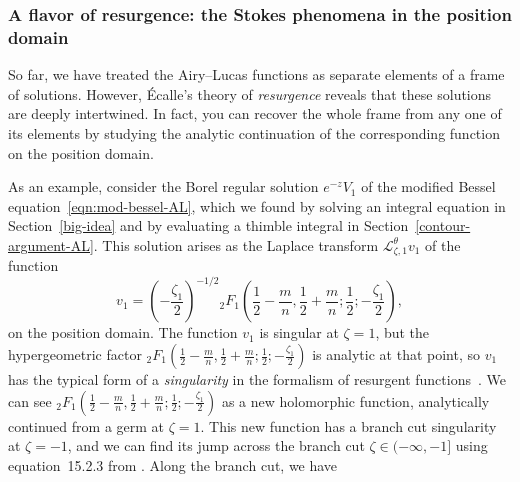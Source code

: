 \documentclass{article}
\newcommand{\laplace}{\mathcal{L}}
\theoremstyle{definition}
\theoremstyle{plain}
\begin{document}
\subsubsection{A flavor of resurgence: the Stokes phenomena in the position domain}\label{resurgence-AL}
%

So far, we have treated the Airy--Lucas functions as separate elements of a frame of solutions. However, \'{E}calle's theory of {\em resurgence} reveals that these solutions are deeply intertwined. In fact, you can recover the whole frame from any one of its elements by studying the analytic continuation of the corresponding function on the position domain.

As an example, consider the Borel regular solution $e^{-z} V_1$ of the modified Bessel equation~\eqref{eqn:mod-bessel-AL}, which we found by solving an integral equation in Section~\ref{big-idea} and by evaluating a thimble integral in Section~\ref{contour-argument-AL}. This solution arises as the Laplace transform $\laplace^\theta_{\zeta, 1} v_1$ of the function
\[ v_1 = \left(-\frac{\zeta_1}{2}\right)^{-1/2} {}_2F_1\left(\frac{1}{2}-\frac{m}{n},\frac{1}{2}+\frac{m}{n};\frac{1}{2};-\frac{\zeta_1}{2}\right), \]
on the position domain. The function $v_1$ is singular at $\zeta = 1$, but the hypergeometric factor ${}_2F_1\left(\frac{1}{2}-\frac{m}{n},\frac{1}{2}+\frac{m}{n};\frac{1}{2};-\frac{\zeta_1}{2}\right)$ is analytic at that point, so $v_1$ has the typical form of a {\em singularity} in the formalism of resurgent functions~\cite[Section~2]{sauzin2021variations}. We can see ${}_2F_1\left(\frac{1}{2}-\frac{m}{n},\frac{1}{2}+\frac{m}{n};\frac{1}{2};-\frac{\zeta_1}{2}\right)$ as a new holomorphic function, analytically continued from a germ at $\zeta = 1$. This new function has a branch cut singularity at $\zeta=-1$, and we can find its jump across the branch cut $\zeta \in (-\infty, -1]$ using equation~15.2.3 from \cite{dlmf}. Along the branch cut, we have
\end{document}
